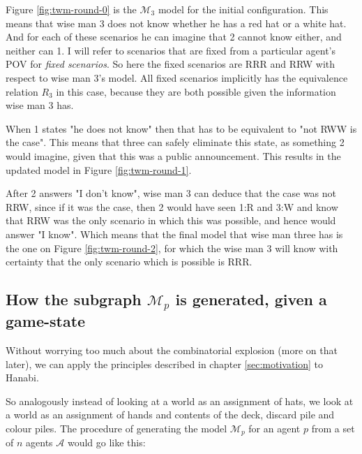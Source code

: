 Figure \ref{fig:twm-round-0} is the $\mathcal{M}_{3}$ model for the initial configuration. 
This means that wise man 3 does not know whether he has a red hat or a white hat. 
And for each of these scenarios he can imagine that 2 cannot know either, and neither can 1. 
I will refer to scenarios that are fixed from a particular agent's POV for \emph{fixed scenarios}. 
So here the fixed scenarios are RRR and RRW with respect to wise man 3's model. 
All fixed scenarios implicitly has the equivalence relation $R_3$ in this case, because they are both possible given the information wise man 3 has.

When 1 states "he does not know" then that has to be equivalent to "not RWW is the case". 
This means that three can safely eliminate this state, as something 2 would imagine, given that this was a public announcement. 
This results in the updated model in Figure \ref{fig:twm-round-1}.

After 2 answers "I don't know", wise man 3 can deduce that the case was not RRW, since if it was the case, then 2 would have seen 1:R and 3:W and know that RRW was the only scenario in which this was possible, and hence would answer "I know". 
Which means that the final model that wise man three has is the one on Figure \ref{fig:twm-round-2}, for which the wise man 3 will know with certainty that the only scenario which is possible is RRR.



\subsection{How the subgraph $\mathcal{M}_p$ is generated, given a game-state} \label{sec:description-of-how-modal-logic-is_applied}
Without worrying too much about the combinatorial explosion (more on that later), we can apply the principles described in chapter \ref{sec:motivation} to Hanabi. 

So analogously instead of looking at a world as an assignment of hats, we look at a world as an assignment of hands and contents of the deck, discard pile and colour piles. 
The procedure of generating the model $\mathcal{M}_p$ for an agent $p$ from a set of $n$ agents $\mathcal{A}$ would go like this:

